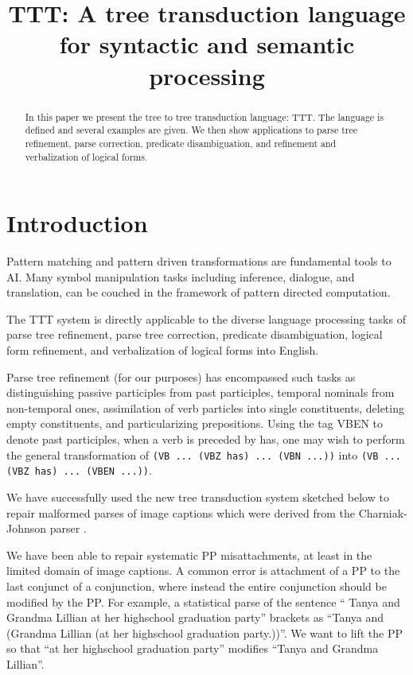 \documentclass[11pt]{article}
\title{TTT: A tree transduction language for syntactic and semantic processing}
\date{}
\begin{document}
\maketitle
\begin{abstract}
In this paper we present the tree to tree transduction language: TTT.  The language is defined and several examples are given.  We then show applications to parse tree refinement, parse correction, predicate disambiguation, and refinement and verbalization of logical forms. 


\end{abstract}

\section{Introduction}
Pattern matching and pattern driven transformations are fundamental tools to AI.  Many symbol manipulation tasks including inference, dialogue, and translation, can be couched in the framework of pattern directed computation.


The TTT system is directly applicable to the diverse language processing tasks of parse tree refinement, parse tree correction, predicate disambiguation, logical form refinement, and verbalization of logical forms into English. 



Parse tree refinement (for our purposes) has encompassed such tasks as distinguishing passive participles from past participles, temporal nominals from non-temporal ones, assimilation of verb particles into single constituents, deleting empty constituents, and particularizing prepositions.   Using the tag VBEN to denote past participles, when a verb is preceded by has, one may wish to perform the general transformation of  \texttt{(VB ... (VBZ has) ... (VBN ...))}  into \texttt{(VB ... (VBZ has) ... (VBEN ...))}.


We have successfully used the new tree transduction system sketched below to repair malformed parses of image captions which were derived from the Charniak-Johnson parser \cite{charniak-johnson-2005}.

We have been able to repair systematic PP misattachments, at least in the limited domain of image captions.   A common error is attachment of a PP to the last conjunct of a conjunction, where instead the entire conjunction should be modified by the PP.  For example, a statistical parse of the sentence `` Tanya and Grandma Lillian at her highschool graduation party'' brackets as ``Tanya and (Grandma Lillian (at her highschool graduation party.))''.  We want to lift the PP so that ``at her highschool graduation party'' modifies ``Tanya and Grandma Lillian''.
\end{document}
